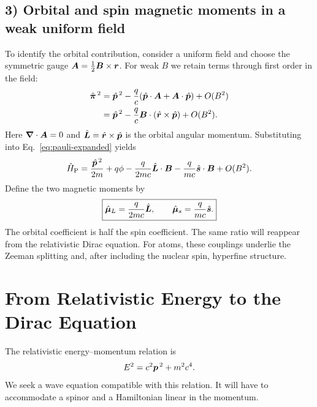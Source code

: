 \subsection*{3) Orbital and spin magnetic moments in a weak uniform field}
To identify the orbital contribution, consider a uniform field and choose the symmetric gauge
$\bm{A}=\frac12\bm{B}\times\bm{r}$. For weak $B$ we retain terms through first order in the field:
\begin{equation}
\begin{aligned}
\hat{\bm{\pi}}^{\,2}
 &=\hat{\bm{p}}^{\,2}-\frac qc(\hat{\bm{p}}\cdot\bm{A}+\bm{A}\cdot\hat{\bm{p}})+O(B^2)\\
 &=\hat{\bm{p}}^{\,2}-\frac{q}{c}\bm{B}\cdot(\hat{\bm{r}}\times\hat{\bm{p}})+O(B^2).
\end{aligned}
\end{equation}
Here $\bm{\nabla}\cdot\bm{A}=0$ and $\hat{\bm{L}}=\hat{\bm{r}}\times\hat{\bm{p}}$ is the orbital angular momentum. Substituting into Eq.~\eqref{eq:pauli-expanded} yields
\begin{equation}
 \hat{H}_{\mathrm P}=\frac{\hat{\bm{p}}^{\,2}}{2m}+q\phi
 -\frac{q}{2mc}\hat{\bm{L}}\cdot\bm{B}
 -\frac{q}{mc}\hat{\bm{s}}\cdot\bm{B}+O(B^2).
\end{equation}
Define the two magnetic moments by
\begin{equation}
 \boxed{\hat{\bm{\mu}}_L=\frac{q}{2mc}\hat{\bm{L}},\qquad
 \hat{\bm{\mu}}_s=\frac{q}{mc}\hat{\bm{s}}.}
\end{equation}
The orbital coefficient is half the spin coefficient. The same ratio will reappear from the relativistic Dirac equation. For atoms, these couplings underlie the Zeeman splitting and, after including the nuclear spin, hyperfine structure.



\section{From Relativistic Energy to the Dirac Equation}
The relativistic energy--momentum relation is
\begin{equation}\label{eq:mass-shell}
 E^2=c^2\bm{p}^{\,2}+m^2c^4.
\end{equation}
We seek a wave equation compatible with this relation. It will have to accommodate a spinor and a Hamiltonian linear in the momentum.

